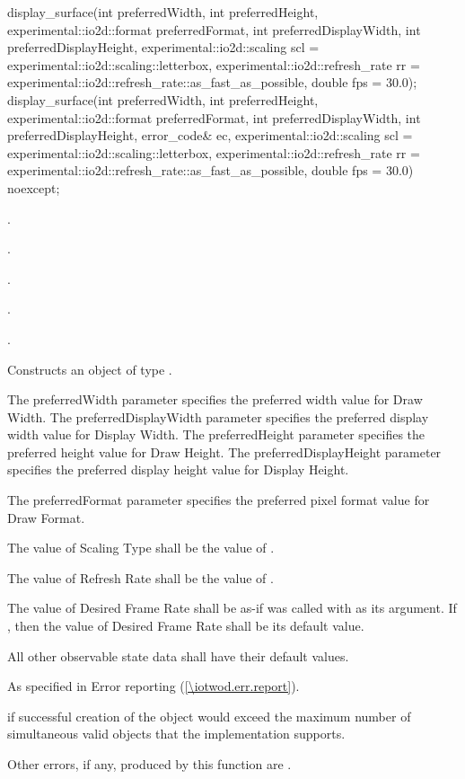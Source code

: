 \begin{itemdecl}
display_surface(int preferredWidth, int preferredHeight, 
  experimental::io2d::format preferredFormat,
  int preferredDisplayWidth, int preferredDisplayHeight,
  experimental::io2d::scaling scl = experimental::io2d::scaling::letterbox,
    experimental::io2d::refresh_rate rr =
    experimental::io2d::refresh_rate::as_fast_as_possible, double fps = 30.0);
display_surface(int preferredWidth, int preferredHeight, 
  experimental::io2d::format preferredFormat,
  int preferredDisplayWidth, int preferredDisplayHeight, error_code& ec,
  experimental::io2d::scaling scl = experimental::io2d::scaling::letterbox,
    experimental::io2d::refresh_rate rr =
    experimental::io2d::refresh_rate::as_fast_as_possible, double fps = 30.0) 
  noexcept;
\end{itemdecl}
\begin{itemdescr}
\pnum
\requires
{}.

\pnum
{}.

\pnum
{}.

\pnum
{}.

\pnum
{}.

\pnum
\effects
Constructs an object of type .

\pnum
The preferredWidth parameter specifies the preferred width value for Draw Width. The preferredDisplayWidth parameter specifies the preferred display width value for Display Width. The preferredHeight parameter specifies the preferred height value for Draw Height. The preferredDisplayHeight parameter specifies the preferred display height value for Display Height.

\pnum
The preferredFormat parameter specifies the preferred pixel format value for Draw Format.

\pnum
The value of Scaling Type shall be the value of .

\pnum
The value of Refresh Rate shall be the value of .

\pnum
The value of Desired Frame Rate shall be as-if  was called with  as its argument. If , then the value of Desired Frame Rate shall be its default value.

\pnum
All other observable state data shall have their default values.

\pnum
\throws
As specified in Error reporting (\ref{\iotwod.err.report}).

\pnum
\errors
{} if successful creation of the  object would exceed the maximum number of simultaneous valid  objects that the implementation supports.

\pnum
Other errors, if any, produced by this function are .
\end{itemdescr}

